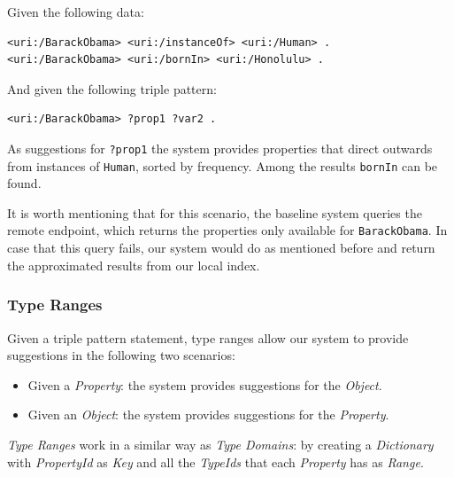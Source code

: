 \begin{example}
Given the following data:
\begin{verbatim}
<uri:/BarackObama> <uri:/instanceOf> <uri:/Human> .
<uri:/BarackObama> <uri:/bornIn> <uri:/Honolulu> .
\end{verbatim}

And given the following triple pattern:
\begin{verbatim}
<uri:/BarackObama> ?prop1 ?var2 .
\end{verbatim}

As suggestions for \texttt{?prop1} the system provides properties that direct outwards from instances of \texttt{Human}, sorted by frequency. Among the results \texttt{bornIn} can be found.

It is worth mentioning that for this scenario, the baseline system queries the remote endpoint, which returns the properties only available for \texttt{BarackObama}. In case that this query fails, our system would do as mentioned before and return the approximated results from our local index.
\end{example}

\subsubsection{Type Ranges}

Given a triple pattern statement, type ranges allow our system to provide suggestions in the following two scenarios:
\begin{itemize}
    \item Given a \textit{Property}: the system provides suggestions for the \textit{Object}.
    \item Given an \textit{Object}: the system provides suggestions for the \textit{Property}.
\end{itemize}

\textit{Type Ranges} work in a similar way as \textit{Type Domains}: by creating a \textit{Dictionary} with \textit{PropertyId} as \textit{Key} and all the \textit{TypeIds} that each \textit{Property} has as \textit{Range}.

